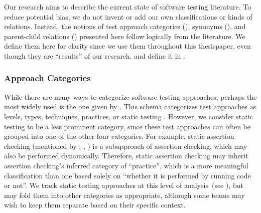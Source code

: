 Our research aims to describe the current state of software testing
literature. To reduce potential bias, we do not invent or add our own
classifications or kinds of relations. Instead, the notions of test approach
categories (), synonyms (), and
parent-child relations () presented here
follow logically from the literature. We define them here for clarity
since we use them throughout this \ifnotpaper thesis\else paper\fi, even
though they are ``results'' of our research. \rigidBlurb{} and define it
in .

\subsubsection{Approach Categories}
\label{categories-observ}

While there are many ways to categorize software testing approaches, perhaps
the most widely used is the one given by \ifnotpaper\else \citeauthor{IEEE2022}
\fi \citet{IEEE2022}. This schema categorizes test approaches as levels, types,
techniques, practices, or static testing \citeyearpar[Fig.~2; see
    ]{IEEE2022}. However, we consider static testing to be a
less prominent category, since these test approaches can often be grouped into
one of the other four categories. For example, static assertion checking
(mentioned by \ifnotpaper \citealp[p.~345]{LahiriEtAl2013};
    \citealp[p.~343]{ChalinEtAl2006}\else \citealp[p.~343]{ChalinEtAl2006},
    \citealp[p.~345]{LahiriEtAl2013}\fi) is a subapproach of assertion checking,
which may also be performed dynamically. Therefore, static assertion checking
may inherit assertion checking's inferred category of ``practice'', which is a
more meaningful classification than one based solely on ``whether it is
performed by running code or not''. We track static testing approaches at this
level of analysis\ifnotpaper\ (see )\fi, but may fold them
into other categories as appropriate, although some teams may wish to keep them
separate based on their specific context.

